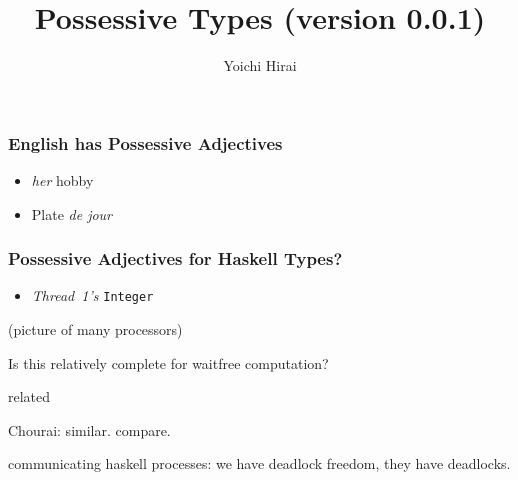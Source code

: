 \documentclass{beamer}
\title{Possessive Types (version 0.0.1)}
\author{Yoichi Hirai}
\begin{document}
\begin{frame}
\maketitle 
\end{frame}

\begin{frame}
\frametitle{English has Possessive Adjectives}

\begin{itemize}
 \item \textit{her} hobby
 \item Plate \textit{de jour}
\end{itemize}
\end{frame}

\begin{frame}
\frametitle{Possessive Adjectives for Haskell Types?}
\begin{itemize}
 \item \textit{Thread~1's} \texttt{Integer}
\end{itemize} 
(picture of many processors)
\end{frame}

\begin{frame}
 Is this relatively complete for waitfree computation?
\end{frame}

\begin{frame}
 related

 Chourai: similar. compare.

 communicating haskell processes:
 we have deadlock freedom, they have deadlocks.
\end{frame}
\end{document}
